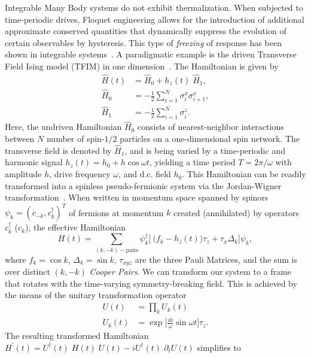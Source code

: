 \documentclass[%
reprint,
superscriptaddress,
amsmath,amssymb,
aps,
prb,
showkeys,
]{revtex4-2}
\begin{document}
Integrable Many Body systems do not exhibit thermalization. When subjected to time-periodic drives, Floquet engineering allows for the introduction of additional approximate conserved quantities that dynamically suppress the evolution of certain observables by hysteresis. This type of \textit{freezing} of response
has been shown in integrable systems~\cite{roy_fate_2015}.
A paradigmatic example is  the driven Transverse Field Ising model (TFIM) in one dimension~\cite{stinchcombe_ising_1973}. The Hamiltonian is given by
\begin{align}
	\label{eq:tfim:hamilt}
	\hat{H}(t) &= \hat{H}_0 + h_z(t) \; \hat{H}_1,\\
	\hat{H}_0 &= -\frac{1}{2}\sum^N_{i=1} \sigma^x_i \sigma^x_{i+1},\\
	\hat{H}_1 &= -\frac{1}{2}\sum_{i=1}^N \sigma^z_{i}.
\end{align}
Here, the undriven Hamiltonian $\hat{H}_0$ consists of nearest-neighbor interactions between $N$ number of  spin-$1/2$ particles on a one-dimensional spin network. The transverse field is denoted by $\hat{H}_1$, and is being varied by a time-periodic and harmonic signal $h_z(t) = h_0 + h\cos{\omega t}$, yielding a time period $T=2\pi/\omega$ with amplitude $h$, drive frequency $\omega$, and d.c. field $h_0$. This Hamiltonian can be readily transformed into a spinless pseudo-fermionic system via the Jordan-Wigner transformation~\cite{mbeng_quantum_2020}. When written in momentum space spanned by spinors $\psi_k = (c_{-k}, c^\dagger_k)^T$ of fermions at momentum $k$ created (annihilated) by operators $c^\dagger_k$ ($c_k$), the effective Hamiltonian
\begin{equation}
	\label{eq:TFIM:fermions}
	H(t) = \sum_{(k,-k)-\mbox{pairs}} \psi^\dagger_k
	\Bigg[\ \bigg(f_k - h_z(t)\bigg)\tau_z +  \tau_x \Delta_k\Bigg]\psi_k ,
\end{equation}
where $f_k = \cos{k}$, $\Delta_k = \sin{k}$, $\tau_{xyz}$ are the three Pauli Matrices, and the sum is over distinct $(k, -k)$ \textit{Cooper Pairs}. We can transform our system to a frame that rotates with the time-varying symmetry-breaking field. This is achieved by the means of the unitary transformation operator~\cite{Engelhardt2013}
\begin{align}
	\label{eq:rotation:tfim}
	U(t) &= \prod_k U_k(t)\\
	U_k(t) &= \exp{\Big[\frac{i h}{\omega}\sin{\omega t}\Big]\tau_z}.\nonumber
\end{align} 
The resulting transformed Hamiltonian $H^\prime(t) = U^\dagger(t)\;H(t)\;U(t)-iU^\dagger(t)\;\partial_tU(t)$ simplifies to
\end{document}
